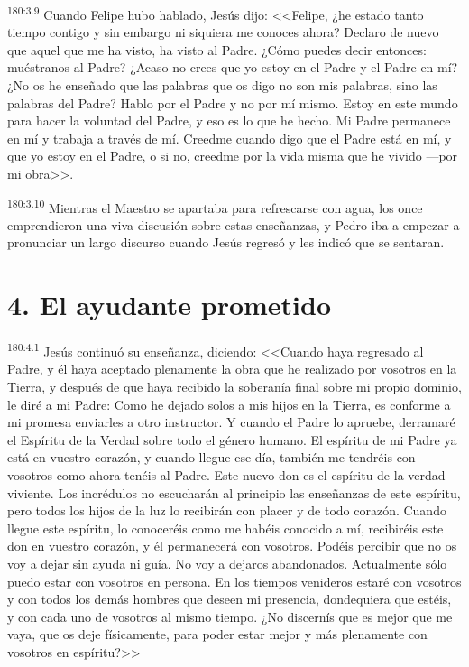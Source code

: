\par 
\textsuperscript{180:3.9} Cuando Felipe hubo hablado, Jesús dijo: <<Felipe, ¿he estado tanto tiempo contigo y sin embargo ni siquiera me conoces ahora? Declaro de nuevo que aquel que me ha visto, ha visto al Padre. ¿Cómo puedes decir entonces: muéstranos al Padre? ¿Acaso no crees que yo estoy en el Padre y el Padre en mí? ¿No os he enseñado que las palabras que os digo no son mis palabras, sino las palabras del Padre? Hablo por el Padre y no por mí mismo. Estoy en este mundo para hacer la voluntad del Padre, y eso es lo que he hecho. Mi Padre permanece en mí y trabaja a través de mí. Creedme cuando digo que el Padre está en mí, y que yo estoy en el Padre, o si no, creedme por la vida misma que he vivido ---por mi obra>>.

\par 
\textsuperscript{180:3.10} Mientras el Maestro se apartaba para refrescarse con agua, los once emprendieron una viva discusión sobre estas enseñanzas, y Pedro iba a empezar a pronunciar un largo discurso cuando Jesús regresó y les indicó que se sentaran.

\section*{4. El ayudante prometido}
\par 
\textsuperscript{180:4.1} Jesús continuó su enseñanza, diciendo: <<Cuando haya regresado al Padre, y él haya aceptado plenamente la obra que he realizado por vosotros en la Tierra, y después de que haya recibido la soberanía final sobre mi propio dominio, le diré a mi Padre: Como he dejado solos a mis hijos en la Tierra, es conforme a mi promesa enviarles a otro instructor. Y cuando el Padre lo apruebe, derramaré el Espíritu de la Verdad sobre todo el género humano. El espíritu de mi Padre ya está en vuestro corazón, y cuando llegue ese día, también me tendréis con vosotros como ahora tenéis al Padre. Este nuevo don es el espíritu de la verdad viviente. Los incrédulos no escucharán al principio las enseñanzas de este espíritu, pero todos los hijos de la luz lo recibirán con placer y de todo corazón. Cuando llegue este espíritu, lo conoceréis como me habéis conocido a mí, recibiréis este don en vuestro corazón, y él permanecerá con vosotros. Podéis percibir que no os voy a dejar sin ayuda ni guía. No voy a dejaros abandonados. Actualmente sólo puedo estar con vosotros en persona. En los tiempos venideros estaré con vosotros y con todos los demás hombres que deseen mi presencia, dondequiera que estéis, y con cada uno de vosotros al mismo tiempo. ¿No discernís que es mejor que me vaya, que os deje físicamente, para poder estar mejor y más plenamente con vosotros en espíritu?>>

